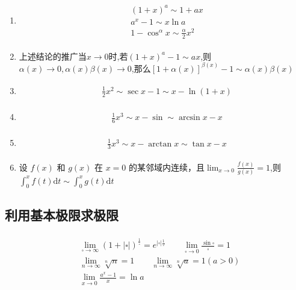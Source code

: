 \documentclass[12pt, a4paper, oneside, UTF8]{ctexbook}
\begin{document}
\begin{sloppypar}
\begin{enumerate}
        \item     \begin{align*} \boxed{\begin{aligned}& (1+x)^a \sim  1+ax   \\& a^x - 1 \sim x \ln a \\& 1- \cos^{\alpha} x \sim \frac{\alpha}{2}x^2\end{aligned}}\end{align*}
        \item     {上述结论的推广}{}当$x \to 0$时,若$(1+x)^a -1 \sim ax$,则$\alpha (x) \to 0,\alpha(x)\beta(x) \to 0$,那么$[1+\alpha(x)]^{\beta(x)} -1 \sim \alpha(x) \beta(x)$
        \item     \begin{align*} \boxed
            {
                \begin{aligned}
                     & \frac{1}{2} x^2  \sim \sec x -1 \sim x- \ln(1+x)
                \end{aligned}
            }
        \end{align*}
        \item     \begin{align*} \boxed
            {
                \begin{aligned}
                     & \frac{1}{6} x^3 \sim x-\sin \sim \arcsin x -x
                \end{aligned}
            }
        \end{align*}
        \item     \begin{align*} \boxed
            {
                \begin{aligned}
                     & \frac{1}{3} x^3 \sim x-\arctan x \sim \tan x-x
                \end{aligned}
            }
        \end{align*}
        \item  设 $f(x)$ 和 $g(x)$ 在 $x=0$ 的某邻域内连续，且$\operatorname*{lim}_{x\rightarrow0}\frac{f(x)}{g(x)}=1$,则$\int_{0}^{x}f(t)\mathrm{d}t\sim\int_{0}^{x}g(t)\mathrm{d}t$
    \end{enumerate}
    \subsection{利用基本极限求极限}
    \begin{align*} \boxed
        {
            \begin{aligned}
                 & \lim_{\square \to \infty }(1+|\square|)^{\frac{1}{\square}}=e^{|\square| \frac{1}{\square}} \qquad     \lim _ { \square \rightarrow 0 } \frac { \sin \square } { \square } = 1 \\
                 & \lim_{n \to \infty }\sqrt[n]{n}=1 \qquad \lim_{n \to \infty} \sqrt[n]{a}=1(a>0)                                                                                                \\
                 & \lim_{x \to 0} \frac{a^x-1}{x}=\ln a
            \end{aligned}
        }
    \end{align*}

\end{sloppypar}
\end{document}
